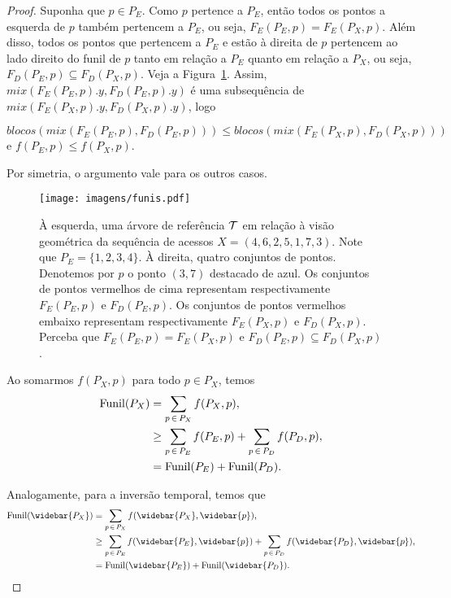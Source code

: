 \begin{proof}
    Suponha que $p \in P_E$. Como $p$ pertence a $P_E$, então todos os pontos a esquerda de $p$ também pertencem a $P_E$, ou seja, $F_E(P_E,p) = F_E(P_X,p)$. Além disso, todos os pontos que pertencem a $P_E$ e estão à direita de $p$ pertencem ao lado direito do funil de $p$ tanto em relação a $P_E$ quanto em relação a $P_X$, ou seja, $F_D(P_E,p) \subseteq F_D(P_X,p)$. Veja a Figura~\ref{fig:funis}. Assim, $mix(F_E(P_E,p).y,F_D(P_E,p).y)$ é uma subsequência de $mix(F_E(P_X,p).y,F_D(P_X,p).y)$, logo 
    \begin{center}
        $blocos(mix(F_E(P_E,p), F_D(P_E,p))) \leq blocos(mix(F_E(P_X,p), F_D(P_X,p)))$ \mbox{e}
        $f(P_E,p) \leq f(P_X,p)$.
    \end{center}
    Por simetria, o argumento vale para os outros casos.
    \begin{figure}
        \centering
        \texttt{[image: imagens/funis.pdf]}
        \caption{À esquerda, uma árvore de referência $\mathcal{T}$ em relação à visão geométrica da sequência de acessos $X = (4,6,2,5,1,7,3)$. Note que $P_E = \{1,2,3,4\}$. À direita, quatro conjuntos de pontos. Denotemos por $p$ o ponto $(3,7)$ destacado de azul. Os conjuntos de pontos vermelhos de cima representam respectivamente $F_E(P_E,p)$ e $F_D(P_E,p)$. Os conjuntos de pontos vermelhos embaixo representam respectivamente $F_E(P_X,p)$ e $F_D(P_X,p)$. Perceba que $F_E(P_E,p) = F_E(P_X,p)$ e $F_D(P_E,p) \subseteq F_D(P_X,p)$.}
    \label{fig:funis}
    \end{figure}

    Ao somarmos $f(P_X,p)$ para todo $p \in P_X$, temos
    \begin{align}
        \mathrm{Funil}(P_X) &= \sum_{p \, \in \, P_X}f(P_X,p), \notag\\
        &\geq \sum_{p \, \in \, P_E}f(P_E,p) + \sum_{p \, \in \, P_D}f(P_D,p), \notag \\
        &= \mathrm{Funil}(P_E) + \mathrm{Funil}(P_D). \label{eq:funil}
    \end{align}

    Analogamente, para a inversão temporal, temos que
    \begin{align}
        \Funil(\widebar{P_X}) &= \sum_{p \, \in \, P_X}f(\widebar{P_X},\widebar{p}), \notag\\
        &\geq \sum_{p \, \in \, P_E}f(\widebar{P_E},\widebar{p}) + \sum_{p \, \in \, P_D}f(\widebar{P_D},\widebar{p}), \notag \\
        &= \Funil(\widebar{P_E}) + \Funil(\widebar{P_D}). \label{eq:funil_barra}
    \end{align}


\end{proof}
